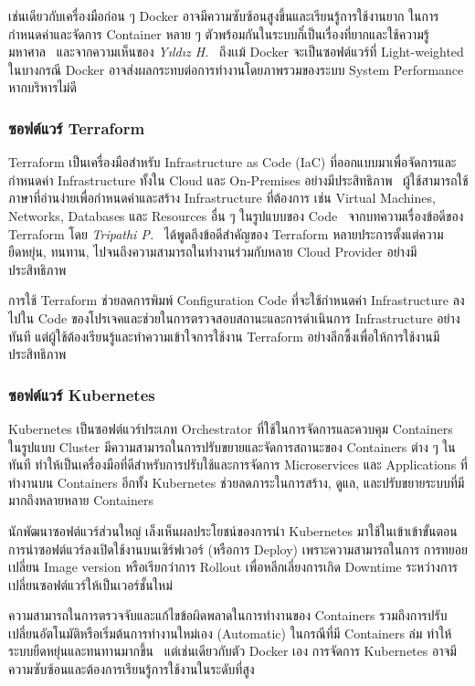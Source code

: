 \documentclass[12pt,one side,openright,a4paper]{cpe-thesis-th}
\newcommand{\thaijustify}[1]{%
  \par\hspace{30pt}\justifying
  #1
}
\begin{document}
            \thaijustify{
                เช่นเดียวกับเครื่องมือก่อน ๆ Docker อาจมีความซับซ้อนสูงขึ้นและเรียนรู้การใช้งานยาก ในการกำหนดค่าและจัดการ Container หลาย ๆ ตัวพร้อมกันในระบบก็๋เป็นเรื่องที่ยากและใช้ความรู้มหาศาล~\cite{dockerdoc} และจากความเห็นของ \textit{Yıldız H.}~\cite{yıldız23docker} ถึงเเม้ Docker จะเป็นซอฟต์แวร์ที่ Light-weighted ในบางกรณี Docker อาจส่งผลกระทบต่อการทำงานโดยภาพรวมของระบบ System Performance หากบริหารไม่ดี
            }
        \subsubsection{ซอฟต์แวร์ Terraform}
            \thaijustify{
                Terraform เป็นเครื่องมือสำหรับ Infrastructure as Code (IaC) ที่ออกแบบมาเพื่อจัดการและกำหนดค่า Infrastructure ทั้งใน Cloud และ On-Premises อย่างมีประสิทธิภาพ~\cite{terraform} ผู้ใช้สามารถใช้ภาษาที่อ่านง่ายเพื่อกำหนดค่าและสร้าง Infrastructure ที่ต้องการ เช่น Virtual Machines, Networks, Databases และ Resources อื่น ๆ ในรูปแบบของ Code~\cite{terraform} จากบทความเรื่องข้อดีของ Terraform โดย \textit{Tripathi P.}~\cite{tripathi23terraform} ได้พูดถึงข้อดีสำคัญของ Terraform หลายประการตั้งแต่ความยืดหยุ่น, ทนทาน, ไปจนถึงความสามารถในทำงานร่วมกับหลาย Cloud Provider อย่างมีประสิทธิภาพ 
            }
            \thaijustify{
                การใช้ Terraform ช่วยลดการพิมพ์ Configuration Code ที่จะใช้กำหนดค่า Infrastructure ลงไปใน Code ของโปรเจคและช่วยในการตรวจสอบสถานะและการดำเนินการ Infrastructure อย่างทันที แต่ผู้ใช้ต้องเรียนรู้และทำความเข้าใจการใช้งาน Terraform อย่างลึกซึ้งเพื่อให้การใช้งานมีประสิทธิภาพ~\cite{stanfield22iac}
            }
        \subsubsection{ซอฟต์แวร์ Kubernetes}
            \thaijustify{
                Kubernetes เป็นซอฟต์แวร์ประเภท Orchestrator ที่ใช้ในการจัดการและควบคุม Containers ในรูปแบบ Cluster มีความสามารถในการปรับขยายและจัดการสถานะของ Containers ต่าง ๆ ในทันที ทำให้เป็นเครื่องมือที่ดีสำหรับการปรับใช้และการจัดการ Microservices และ Applications ที่ทำงานบน Containers อีกทั้ง Kubernetes ช่วยลดภาระในการสร้าง, ดูแล, และปรับขยายระบบที่มีมากถึงหลายหลาย Containers~\cite{kubernetes}
            }
            \thaijustify{
                นักพัฒนาซอฟต์แวร์ส่วนใหญ่ เล็งเห็นผลประโยชน์ของการนำ Kubernetes มาใช้ในเข้าเข้าขั้นตอนการนำซอฟต์แวร์ลงเปิดใช้งานบนเซิร์ฟเวอร์ (หรือการ Deploy) เพราะความสามารถในการ การทยอยเปลี่ยน Image version หรือเรียกว่าการ Rollout เพื่อหลีกเลี่ยงการเกิด Downtime ระหว่างการเปลี่ยนซอฟต์แวร์ให้เป็นเวอร์ชั้นใหม่~\cite{kubemed20}
            }
            \thaijustify{
                ความสามารถในการตรวจจับและแก้ไขข้อผิดพลาดในการทำงานของ Containers รวมถึงการปรับเปลี่ยนอัตโนมัติหรือเริ่มต้นการทำงานใหม่เอง (Automatic) ในกรณีที่มี Containers ล่ม ทำให้ระบบยืดหยุ่นและทนทานมากขึ้น~\cite{kubernetes} แต่เช่นเดียวกับตัว Docker เอง การจัดการ Kubernetes อาจมีความซับซ้อนและต้องการเรียนรู้การใช้งานในระดับที่สูง
            }
\end{document}

